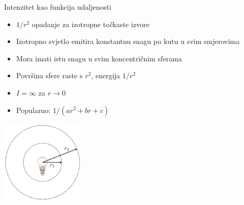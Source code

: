 \documentclass[9pt]{beamer}
\begin{document}
\begin{frame}{Intenzitet kao funkcija udaljenosti}
	\begin{itemize}
		\item $1/r^2$ opadanje za izotropne točkaste izvore
		\item Izotropno svjetlo emitira konstantnu snagu po kutu u svim smjerovima
		\item Mora imati istu snagu u svim koncentričnim sferama
		\item Površina sfere raste s $r^2$, energija $1/r^2$
		\item $I=\infty$ za $r\rightarrow 0$
		\item Popularno: $1/(ar^2 + br +c)$
	\end{itemize}
	\begin{center}
	\includegraphics[height=4cm]{slike/slide_027_cropped.jpg}
\end{center}
\end{frame}
\end{document}
